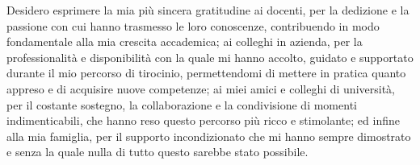 Desidero esprimere la mia più sincera gratitudine ai docenti, per la dedizione e la passione con cui hanno
trasmesso le loro conoscenze, contribuendo in modo fondamentale alla mia crescita accademica;
ai colleghi in azienda, per la professionalità e disponibilità con la quale mi hanno accolto,
guidato e supportato durante il mio percorso di tirocinio, permettendomi di mettere in pratica quanto appreso
e di acquisire nuove competenze;
ai miei amici e colleghi di università, per il costante sostegno, la collaborazione e la condivisione
di momenti indimenticabili, che hanno reso questo percorso più ricco e stimolante;
ed infine alla mia famiglia, per il supporto incondizionato che mi hanno
sempre dimostrato e senza la quale nulla di tutto questo sarebbe stato possibile.